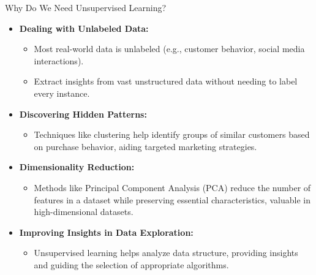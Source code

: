 \documentclass[aspectratio=169]{beamer}
\begin{document}
\begin{frame}[fragile]{Why Do We Need Unsupervised Learning?}
    \begin{itemize}
        \item \textbf{Dealing with Unlabeled Data:}
        \begin{itemize}
            \item Most real-world data is unlabeled (e.g., customer behavior, social media interactions).
            \item Extract insights from vast unstructured data without needing to label every instance.
        \end{itemize}
        
        \item \textbf{Discovering Hidden Patterns:}
        \begin{itemize}
            \item Techniques like clustering help identify groups of similar customers based on purchase behavior, aiding targeted marketing strategies.
        \end{itemize}
        
        \item \textbf{Dimensionality Reduction:}
        \begin{itemize}
            \item Methods like Principal Component Analysis (PCA) reduce the number of features in a dataset while preserving essential characteristics, valuable in high-dimensional datasets.
        \end{itemize}
        
        \item \textbf{Improving Insights in Data Exploration:}
        \begin{itemize}
            \item Unsupervised learning helps analyze data structure, providing insights and guiding the selection of appropriate algorithms.
        \end{itemize}
    \end{itemize}
\end{frame}
\end{document}
